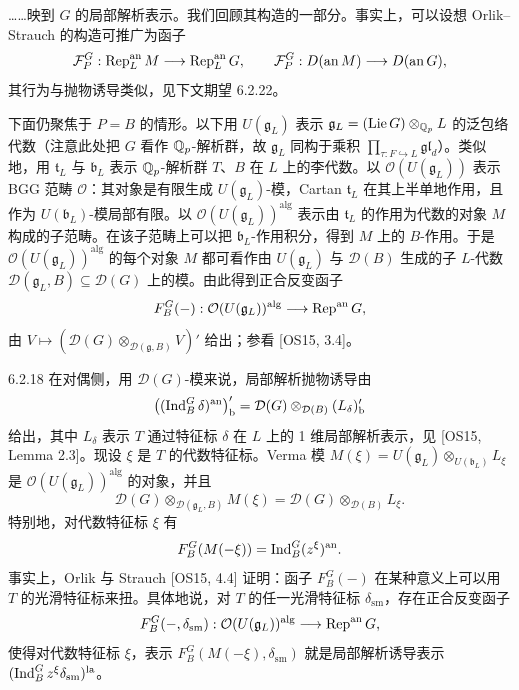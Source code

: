 
……映到 $G$ 的局部解析表示。我们回顾其构造的一部分。事实上，可以设想 Orlik--Strauch 的构造可推广为函子
\[
\mathcal F_P^G:\operatorname{Rep}_L^{\mathrm{an}}M\longrightarrow\operatorname{Rep}_L^{\mathrm{an}}G,\qquad
\mathcal F_P^G:D(\mathrm{an}\,M)\longrightarrow D(\mathrm{an}\,G),
\]
其行为与抛物诱导类似，见下文期望 6.2.22。

下面仍聚焦于 $P=B$ 的情形。以下用 $U(\mathfrak g_L)$ 表示 $\mathfrak g_L=(\operatorname{Lie}G)\otimes_{\mathbb{Q}_p}L$ 的泛包络代数（注意此处把 $G$ 看作 $\mathbb{Q}_p$-解析群，故 $\mathfrak g_L$ 同构于乘积 $\prod_{\tau:F\hookrightarrow L}\mathfrak{gl}_d$）。类似地，用 $\mathfrak t_L$ 与 $\mathfrak b_L$ 表示 $\mathbb{Q}_p$-解析群 $T$、$B$ 在 $L$ 上的李代数。以 $\mathcal O(U(\mathfrak g_L))$ 表示 BGG 范畴 $\mathcal O$：其对象是有限生成 $U(\mathfrak g_L)$-模，Cartan $\mathfrak t_L$ 在其上半单地作用，且作为 $U(\mathfrak b_L)$-模局部有限。以 $\mathcal O(U(\mathfrak g_L))^{\mathrm{alg}}$ 表示由 $\mathfrak t_L$ 的作用为代数的对象 $M$ 构成的子范畴。在该子范畴上可以把 $\mathfrak b_L$-作用积分，得到 $M$ 上的 $B$-作用。于是 $\mathcal O(U(\mathfrak g_L))^{\mathrm{alg}}$ 的每个对象 $M$ 都可看作由 $U(\mathfrak g_L)$ 与 $\mathcal D(B)$ 生成的子 $L$-代数 $\mathcal D(\mathfrak g_L,B)\subseteq\mathcal D(G)$ 上的模。由此得到正合反变函子
\[
F_B^G(-):\mathcal O(U(\mathfrak g_L))^{\mathrm{alg}}\longrightarrow\operatorname{Rep}^{\mathrm{an}}G,
\]
由 $V\mapsto(\mathcal D(G)\otimes_{\mathcal D(\mathfrak g,B)}V)'$ 给出；参看 [OS15, 3.4]。

\begin{rem}{6.2.18}\label{rem:a4-6-2-18}
在对偶侧，用 $\mathcal D(G)$-模来说，局部解析抛物诱导由
\[
\bigl((\operatorname{Ind}_B^G\delta)^{\mathrm{an}}\bigr)'_{\mathrm b}
=\mathcal D(G)\otimes_{\mathcal D(B)}(L_\delta)'_{\mathrm b}
\]
给出，其中 $L_\delta$ 表示 $T$ 通过特征标 $\delta$ 在 $L$ 上的 1 维局部解析表示，见 [OS15, Lemma 2.3]。现设 $\xi$ 是 $T$ 的代数特征标。Verma 模 $M(\xi)=U(\mathfrak g_L)\otimes_{U(\mathfrak b_L)}L_\xi$ 是 $\mathcal O(U(\mathfrak g_L))^{\mathrm{alg}}$ 的对象，并且
\[
\mathcal D(G)\otimes_{\mathcal D(\mathfrak g_L,B)}M(\xi)=\mathcal D(G)\otimes_{\mathcal D(B)}L_\xi.
\]
特别地，对代数特征标 $\xi$ 有
\[
F_B^G(M(-\xi))=\operatorname{Ind}_B^G(z^\xi)^{\mathrm{an}}.
\]
事实上，Orlik 与 Strauch [OS15, 4.4] 证明：函子 $F_B^G(-)$ 在某种意义上可以用 $T$ 的光滑特征标来扭。具体地说，对 $T$ 的任一光滑特征标 $\delta_{\mathrm{sm}}$，存在正合反变函子
\[
F_B^G(-,\delta_{\mathrm{sm}}):\mathcal O(U(\mathfrak g_L))^{\mathrm{alg}}\longrightarrow\operatorname{Rep}^{\mathrm{an}}G,
\]
使得对代数特征标 $\xi$，表示 $F_B^G(M(-\xi),\delta_{\mathrm{sm}})$ 就是局部解析诱导表示 $(\operatorname{Ind}_B^Gz^\xi\delta_{\mathrm{sm}})^{\mathrm{la}}$。
\end{rem}

